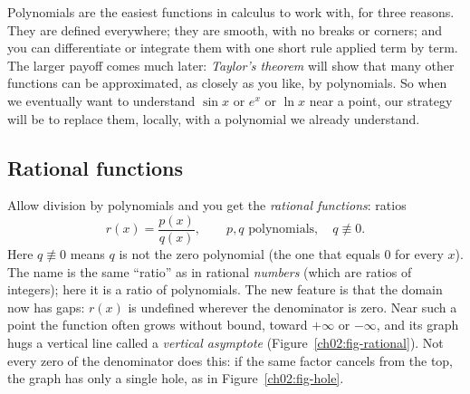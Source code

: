 \begin{aestheticbox}
Polynomials are the easiest functions in calculus to work with, for three reasons.
They are defined everywhere; they are smooth, with no breaks or corners; and you can
differentiate or integrate them with one short rule applied term by term. The
larger payoff comes much later: \emph{Taylor's
theorem} will show that many other functions can be approximated, as closely
as you like, by polynomials. So when we eventually want to understand $\sin x$ or
$e^x$ or $\ln x$ near a point, our strategy will be to replace them, locally, with
a polynomial we already understand.
\end{aestheticbox}

\subsection{Rational functions}

Allow division by polynomials and you get the \emph{rational functions}: ratios
\[
  r(x) = \frac{p(x)}{q(x)}, \qquad p, q \text{ polynomials}, \quad q \not\equiv 0.
\]
Here $q \not\equiv 0$ means $q$ is not the zero polynomial (the one that equals
$0$ for every $x$).
The name is the same ``ratio'' as in rational \emph{numbers} (which are ratios of
integers); here it is a ratio of polynomials. The new feature is
that the domain now has gaps: $r(x)$ is undefined wherever the denominator
is zero. Near such a point the function often grows without bound, toward
$+\infty$ or $-\infty$, and its graph hugs a vertical line called a \emph{vertical
asymptote} (Figure~\ref{ch02:fig-rational}). Not every zero of the denominator does
this: if the same factor cancels from the top, the graph has only a single hole,
as in Figure~\ref{ch02:fig-hole}.

